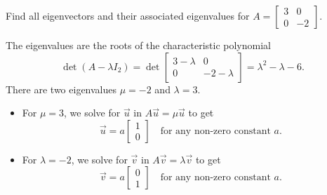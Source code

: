 \documentclass[../main.tex]{subfiles}
\begin{document}
\begin{exercise}
  Find all eigenvectors and their associated eigenvalues for \(A = \begin{bmatrix} 3 & 0 \\ 0 & -2 \end{bmatrix}\).

  \begin{solution}
    The eigenvalues are the roots of the characteristic polynomial \[\det(A - \lambda I_{2}) = \det \begin{bmatrix} 3 - \lambda & 0 \\ 0 & -2 - \lambda \end{bmatrix} = \lambda^{2} - \lambda - 6.\]
    There are two eigenvalues \(\mu = -2\) and \(\lambda = 3\).


    \begin{itemize}
      \item For \(\mu = 3\), we solve for \(\vec{u}\) in \(A \vec{u} = \mu \vec{u}\) to get
        \[
          \vec{u} = a \begin{bmatrix} 1 \\ 0 \end{bmatrix}
          \quad\text{for any non-zero constant } a.
        \]
      \item For \(\lambda = -2\), we solve for \(\vec{v}\) in \(A \vec{v} = \lambda \vec{v}\) to get
        \[
          \vec{v} = a \begin{bmatrix} 0 \\ 1 \end{bmatrix}
          \quad\text{for any non-zero constant } a.
        \]
    \end{itemize}
  \end{solution}
\end{exercise}
\end{document}
